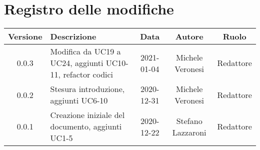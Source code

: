 \section*{Registro delle modifiche}

\begin{center}
	\begin{longtable}{|c|p{5cm}|c|c|c|}
	\hline
	\rowcolor{lighter-grayer}
	\textbf{Versione} & \textbf{Descrizione} & \textbf{Data} & \textbf{Autore} & \textbf{Ruolo} \\
	\hline
	\endfirsthead


	\hline
	0.0.3 & Modifica da UC19 a UC24, aggiunti UC10-11, refactor codici & 2021-01-04 & Michele Veronesi & Redattore \\
	0.0.2 & Stesura introduzione, aggiunti UC6-10 & 2020-12-31 & Michele Veronesi & Redattore\\
    0.0.1 & Creazione iniziale del documento, aggiunti UC1-5 & 2020-12-22 & Stefano Lazzaroni & Redattore\\
	\hline

	\end{longtable}
\end{center}